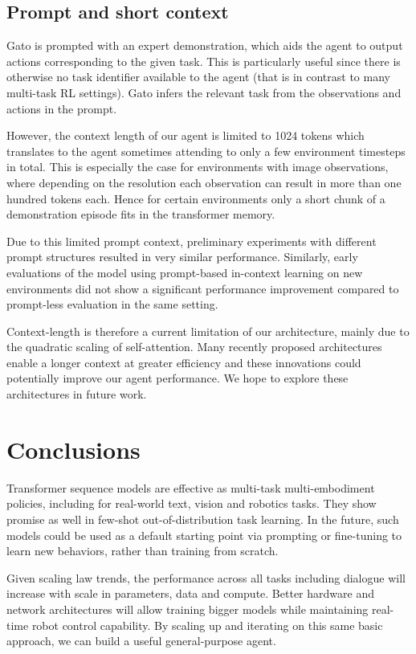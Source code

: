 \documentclass[10pt]{article} \usepackage[accepted]{tmlr}
\begin{document}
\subsection{Prompt and short context}
\vskip 0.2cm
Gato is prompted with an expert demonstration, which aids the agent to output actions corresponding to the given task.
This is particularly useful since there is otherwise no task identifier available to the agent (that is in contrast to many multi-task RL settings).
Gato infers the relevant task from the observations and actions in the prompt.


However, the context length of our agent is limited to 1024 tokens which translates to the agent sometimes attending to only a few environment timesteps in total.
This is especially the case for environments with image observations, where depending on the resolution each observation can result in more than one hundred tokens each.
Hence for certain environments only a short chunk of a demonstration episode fits in the transformer memory. 


Due to this limited prompt context, preliminary experiments with different prompt structures resulted in very similar performance.
Similarly, early evaluations of the model using prompt-based in-context learning on new environments did not show a significant performance improvement compared to prompt-less evaluation in the same setting.


Context-length is therefore a current limitation of our architecture, mainly due to the quadratic scaling of self-attention.
Many recently proposed architectures enable a longer context at greater efficiency and these innovations could potentially improve our agent performance.
We hope to explore these architectures in future work.



\section{Conclusions}
\label{sec:conclusions}


Transformer sequence models are effective as multi-task multi-embodiment policies, including for real-world text, vision and robotics tasks.
They show promise as well in few-shot out-of-distribution task learning.
In the future, such models could be used as a default starting point via prompting or fine-tuning to learn new behaviors, rather than training  from scratch.


Given scaling law trends, the performance across all tasks including dialogue will increase with scale in parameters, data and compute.
Better hardware and network architectures will allow training bigger models while maintaining real-time robot control capability.
By scaling up and iterating on this same basic approach, we can build a useful general-purpose agent. 
\end{document}
